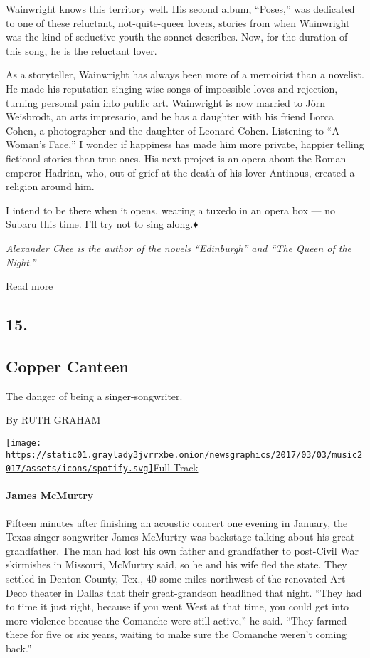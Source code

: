 Wainwright knows this territory well. His second album, ``Poses,'' was
dedicated to one of these reluctant, not-quite-queer lovers, stories
from when Wainwright was the kind of seductive youth the sonnet
describes. Now, for the duration of this song, he is the reluctant
lover.

As a storyteller, Wainwright has always been more of a memoirist than a
novelist. He made his reputation singing wise songs of impossible loves
and rejection, turning personal pain into public art. Wainwright is now
married to Jörn Weisbrodt, an arts impresario, and he has a daughter
with his friend Lorca Cohen, a photographer and the daughter of Leonard
Cohen. Listening to ``A Woman's Face,'' I wonder if happiness has made
him more private, happier telling fictional stories than true ones. His
next project is an opera about the Roman emperor Hadrian, who, out of
grief at the death of his lover Antinous, created a religion around him.

I intend to be there when it opens, wearing a tuxedo in an opera box ---
no Subaru this time. I'll try not to sing along.♦

\emph{Alexander Chee is the author of the novels ``Edinburgh'' and ``The
Queen of the Night.''}

Read more

\hypertarget{15}{%
\subsection{15.}\label{15}}

\hypertarget{--copper-canteen}{%
\subsection{\texorpdfstring{ Copper
Canteen}{  Copper Canteen}}\label{--copper-canteen}}

The danger of being a singer-songwriter.

By RUTH GRAHAM

\href{https://open.spotify.com/track/2jG8qg7KDYWKm9smYCXz1i}{\texttt{[image: https://static01.graylady3jvrrxbe.onion/newsgraphics/2017/03/03/music2017/assets/icons/spotify.svg]}Full
Track}

\hypertarget{james-mcmurtry}{%
\paragraph{James McMurtry}\label{james-mcmurtry}}

Fifteen minutes after finishing an acoustic concert one evening in
January, the Texas singer-songwriter James McMurtry was backstage
talking about his great-grandfather. The man had lost his own father and
grandfather to post-Civil War skirmishes in Missouri, McMurtry said, so
he and his wife fled the state. They settled in Denton County, Tex.,
40-some miles northwest of the renovated Art Deco theater in Dallas that
their great-grandson headlined that night. ``They had to time it just
right, because if you went West at that time, you could get into more
violence because the Comanche were still active,'' he said. ``They
farmed there for five or six years, waiting to make sure the Comanche
weren't coming back.''

